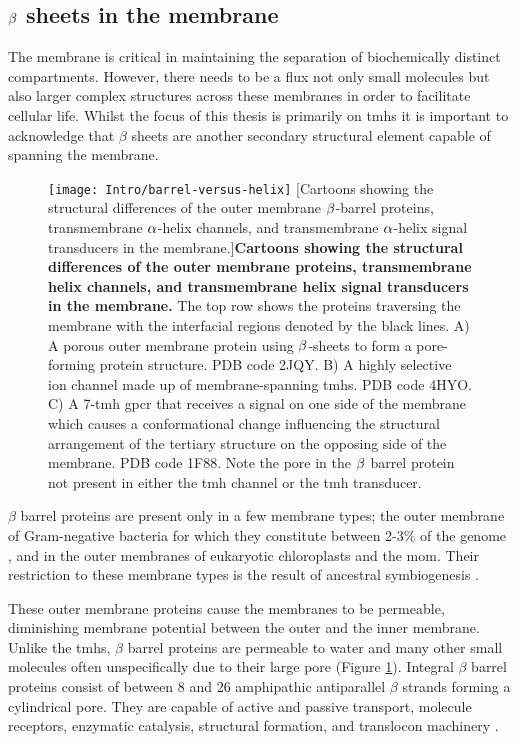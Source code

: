 \subsection{$\protect\beta$ sheets in the membrane}

The membrane is critical in maintaining the separation of biochemically distinct compartments.
However, there needs to be a flux not only small molecules but also larger complex structures across these membranes in order to facilitate cellular life.
Whilst the focus of this thesis is primarily on \gls{tmh}s it is important to acknowledge that $\beta$ sheets are another secondary structural element capable of spanning the membrane.

\begin{figure}[ht]
\centering
\texttt{[image: Intro/barrel-versus-helix]}
		[Cartoons showing the structural differences of the outer membrane $\protect\beta$\--barrel proteins, transmembrane $\protect\alpha$\--helix channels, and transmembrane $\protect\alpha$\--helix signal transducers in the membrane.]{\textbf{Cartoons showing the structural differences of the outer membrane proteins, transmembrane helix channels, and transmembrane helix signal transducers in the membrane.}
		The top row shows the proteins traversing the membrane with the interfacial regions denoted by the black lines.
		A) A porous outer membrane protein using $\protect\beta$\--sheets to form a pore\--forming protein structure.
		PDB code 2JQY.
		B) A highly selective ion channel made up of membrane\--spanning \gls{tmh}s.
		PDB code 4HYO.
		C) A 7\--\gls{tmh} \gls{gpcr} that receives a signal on one side of the membrane which causes a conformational change influencing the structural arrangement of the tertiary structure on the opposing side of the membrane.
		PDB code 1F88.
		Note the pore in the $\protect\beta$ barrel protein not present in either the \gls{tmh} channel or the \gls{tmh} transducer.
		}
\label{fig:barrel-versus-helix}
\end{figure}

$\beta$ barrel proteins are present only in a few membrane types; the outer membrane of Gram\--negative bacteria for which they constitute between 2-3\% of the genome \cite{Wimley2003}, and in the outer membranes of eukaryotic chloroplasts and the \gls{mom}.
Their restriction to these membrane types is the result of ancestral symbiogenesis \cite{McFadden2001, Gray1999, Fischer1994, Zeth2010, Fairman2011, Ulrich2015}.

These outer membrane proteins cause the membranes to be permeable, diminishing membrane potential between the outer and the inner membrane.
Unlike the \gls{tmh}s, $\beta$ barrel proteins are permeable to water and many other small molecules often unspecifically due to their large pore (Figure \ref{fig:barrel-versus-helix}).
Integral $\beta$ barrel proteins consist of between 8 and 26 amphipathic antiparallel $\beta$ strands forming a cylindrical pore.
They are capable of active and passive transport, molecule receptors, enzymatic catalysis, structural formation, and translocon machinery \cite{Wimley2003}.


